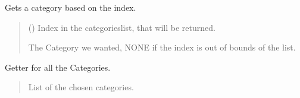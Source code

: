 \documentclass[letterpaper,10pt,english]{sphinxmanual}
\begin{document}
\begin{fulllineitems}
\begin{fulllineitems}
\begin{quote}
\begin{description}
\end{description}\end{quote}

\end{fulllineitems}


\begin{fulllineitems}
\label{\detokenize{apidoc/src.osm_configurator.model.application:src.osm_configurator.model.application.application_interface.IApplication.get_category}}
\pysigstartsignatures
{}
\pysigstopsignatures
\sphinxAtStartPar
Gets a category based on the index.
\begin{quote}\begin{description}
\sphinxAtStartPar
{} () \textendash{} Index in the categories\sphinxhyphen{}list, that will be returned.

\sphinxAtStartPar
The Category we wanted, NONE if the index is out of bounds of the list.

\sphinxAtStartPar
{\hyperref[\detokenize{apidoc/src.osm_configurator.model.project.configuration:src.osm_configurator.model.project.configuration.category.Category}]{}}

\end{description}\end{quote}

\end{fulllineitems}


\begin{fulllineitems}
\label{\detokenize{apidoc/src.osm_configurator.model.application:src.osm_configurator.model.application.application_interface.IApplication.get_categories}}
\pysigstartsignatures
{}
\pysigstopsignatures
\sphinxAtStartPar
Getter for all the Categories.
\begin{quote}\begin{description}
\sphinxAtStartPar
List of the chosen categories.


\end{description}
\end{quote}
\end{fulllineitems}
\end{fulllineitems}
\end{document}
